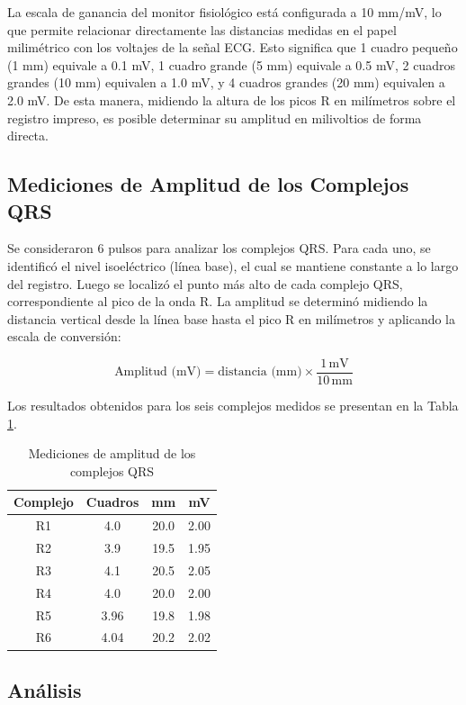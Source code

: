 \documentclass[a4paper,openany,12pt]{book}
\begin{document}
La escala de ganancia del monitor fisiológico está configurada a 10 mm/mV, lo que permite relacionar directamente las distancias medidas en el papel milimétrico con los voltajes de la señal ECG. Esto significa que 1 cuadro pequeño (1 mm) equivale a 0.1 mV, 1 cuadro grande (5 mm) equivale a 0.5 mV, 2 cuadros grandes (10 mm) equivalen a 1.0 mV, y 4 cuadros grandes (20 mm) equivalen a 2.0 mV. De esta manera, midiendo la altura de los picos R en milímetros sobre el registro impreso, es posible determinar su amplitud en milivoltios de forma directa.

\subsection{Mediciones de Amplitud de los Complejos QRS}

Se consideraron 6 pulsos para analizar los complejos QRS. Para cada uno, se identificó el nivel isoeléctrico (línea base), el cual se mantiene constante a lo largo del registro. Luego se localizó el punto más alto de cada complejo QRS, correspondiente al pico de la onda R. La amplitud se determinó midiendo la distancia vertical desde la línea base hasta el pico R en milímetros y aplicando la escala de conversión: 

\[
\text{Amplitud (mV)} = \text{distancia (mm)} \times \frac{1 \, \text{mV}}{10 \, \text{mm}}
\]

Los resultados obtenidos para los seis complejos medidos se presentan en la Tabla \ref{tab:mediciones}.

\begin{table}[h]
	\centering
	\begin{tabular}{|c|c|c|c|}
		\hline
		\textbf{Complejo} & \textbf{Cuadros} & \textbf{mm} & \textbf{mV} \\
		\hline
		R1 & 4.0 & 20.0 & 2.00 \\
		\hline
		R2 & 3.9 & 19.5 & 1.95 \\
		\hline
		R3 & 4.1 & 20.5 & 2.05 \\
		\hline
		R4 & 4.0 & 20.0 & 2.00 \\
		\hline
		R5 & 3.96 & 19.8 & 1.98 \\
		\hline
		R6 & 4.04 & 20.2 & 2.02 \\
		\hline
	\end{tabular}
	\caption{Mediciones de amplitud de los complejos QRS}
	\label{tab:mediciones}
\end{table}

\subsection{Análisis}
\end{document}
